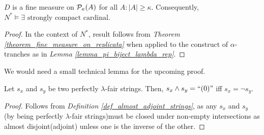 \begin{corollary}\label{corollary_strongly_compact}
    $D$ is a fine measure on $\mathcal{P}_\kappa(A)$ for all $A: |A| \geq \kappa$. Consequently, $N^\ast \models \exists \text{ strongly compact cardinal}$.
\end{corollary}
\begin{proof}
    In the context of $N^\ast$, result follows from \textit{Theorem \ref{theorem_fine_measure_on_replicata}} when applied to the construct of $\alpha$-tranches as in \textit{Lemma \ref{lemma_pi_biject_lambda_rep}}.
\end{proof}

We would need a small technical lemma for the upcoming proof.

\begin{lemma}\label{lemma_inv_pf}
    Let $s_x$ and $s_y$ be two perfectly $\lambda$-fair strings. Then,
    $s_x \land s_y = \text{``}(0)\text{''}$ iff $s_x = \neg s_y$.
\end{lemma}
\begin{proof}
    Follows from \textit{Definition \ref{def_almost_adjoint_strings}}, as any $s_x$ and $s_y$ (by being perfectly $\lambda$-fair strings)must be closed under non-empty intersections as almost disjoint(adjoint) unless one is the inverse of the other.
\end{proof}

